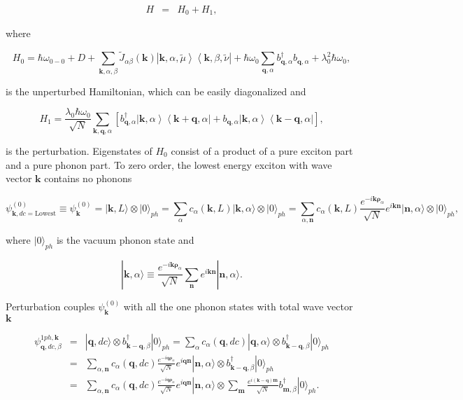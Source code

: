 \documentclass[pt12]{article}
\newcommand{\beq}{\begin{equation}}
\newcommand{\eeq}{\end{equation}}
\newcommand{\bea}{\begin{eqnarray}}
\newcommand{\eea}{\end{eqnarray}}
\newcommand{\bfk}{\mathbf{k}}
\newcommand{\bfq}{\mathbf{q}}
\newcommand{\bfn}{\mathbf{n}}
\newcommand{\bfm}{\mathbf{m}}
\newcommand{\tmu}{\tilde{\mu}}
\newcommand{\tnu}{\tilde{\nu}}
\begin{document}
\begin{eqnarray}\label{H_crystal}
H&=&H_0+H_{1},
\end{eqnarray}

where

\begin{equation}\label{H_0}
H_{0}=\hbar\omega_{0-0}+D+ \sum_{\bfk,\alpha,\beta}
\tilde{J}_{\alpha\beta}(\bfk) \left| \bfk,\alpha,\tmu \right\rangle
\left\langle \bfk,\beta,\tnu \right|+\hbar\omega_0\sum_{\bfq,\alpha}
b^\dagger_{\bfq,\alpha}b_{\bfq,\alpha}+\lambda_0^2\hbar\omega_0 ,
\end{equation}

is the unperturbed Hamiltonian, which can be easily diagonalized and

\begin{equation}\label{H_1}
H_{1}=\frac{\lambda_0\hbar\omega_0}{\sqrt{N}}\sum_{\bfk,\bfq,\alpha}
\left[ b^\dagger_{\bfq,\alpha}\left| \bfk,\alpha \right\rangle
\left\langle \bfk+\bfq,\alpha \right| + b_{\bfq,\alpha}\left|
\bfk,\alpha \right\rangle \left\langle \bfk-\bfq,\alpha \right|
\right],
\end{equation}

is the perturbation. Eigenstates of $H_0$ consist of a product of a
pure exciton part and a pure phonon part. To zero order, the lowest
energy exciton with wave vector $\bfk$ contains no phonons

\beq
\psi_{\bfk,dc=\mathrm{Lowest}}^{(0)}\equiv\psi_{\bfk}^{(0)}=|\bfk,L\rangle\otimes|0\rangle_{ph}=
\sum_{\alpha} c_{\alpha}(\bfk,L)
|\bfk,\alpha\rangle\otimes|0\rangle_{ph}=\sum_{\alpha,\bfn}
c_{\alpha}(\bfk,L)  \frac{e^{-i\bfk \mathbf{\rho}_\alpha}}{\sqrt{N}}
e^{i \bfk \bfn} | \bfn,\alpha \rangle\otimes|0\rangle_{ph},  \eeq

where $|0\rangle_{ph}$ is the vacuum phonon state and

\begin{equation}\label{exc_state_def}
|\bfk,\alpha\rangle \equiv \frac{e^{-i\bfk
\mathbf{\rho}_\alpha}}{\sqrt{N}} \sum_{\bfn} e^{i \bfk \bfn} |
\bfn,\alpha \rangle.
\end{equation}

Perturbation couples $\psi_{\bfk}^{(0)}$ with all the one phonon
states with total wave vector $\bfk$

\bea \psi_{\bfq,dc,\beta}^{1ph,\bfk}&=&|\bfq,dc\rangle\otimes
b^\dagger_{\bfk-\bfq,\beta}|0\rangle_{ph}= \sum_{\alpha}
c_{\alpha}(\bfq,dc) |\bfq,\alpha\rangle\otimes
b^\dagger_{\bfk-\bfq,\beta}|0\rangle_{ph}\\
&=&\sum_{\alpha,\bfn} c_{\alpha}(\bfq,dc) \frac{e^{-i\bfq
\mathbf{\rho}_\alpha}}{\sqrt{N}} e^{i \bfq \bfn} | \bfn,\alpha
\rangle\otimes b^\dagger_{\bfk-\bfq,\beta}|0\rangle_{ph} \\
&=&\sum_{\alpha,\bfn} c_{\alpha}(\bfq,dc) \frac{e^{-i\bfq
\mathbf{\rho}_\alpha}}{\sqrt{N}} e^{i \bfq \bfn} | \bfn,\alpha
\rangle\otimes \sum_{\bfm}\frac{e^{i (\bfk-\bfq) \bfm}}{\sqrt{N}}
b^\dagger_{\bfm,\beta}|0\rangle_{ph}. \eea
\end{document}
